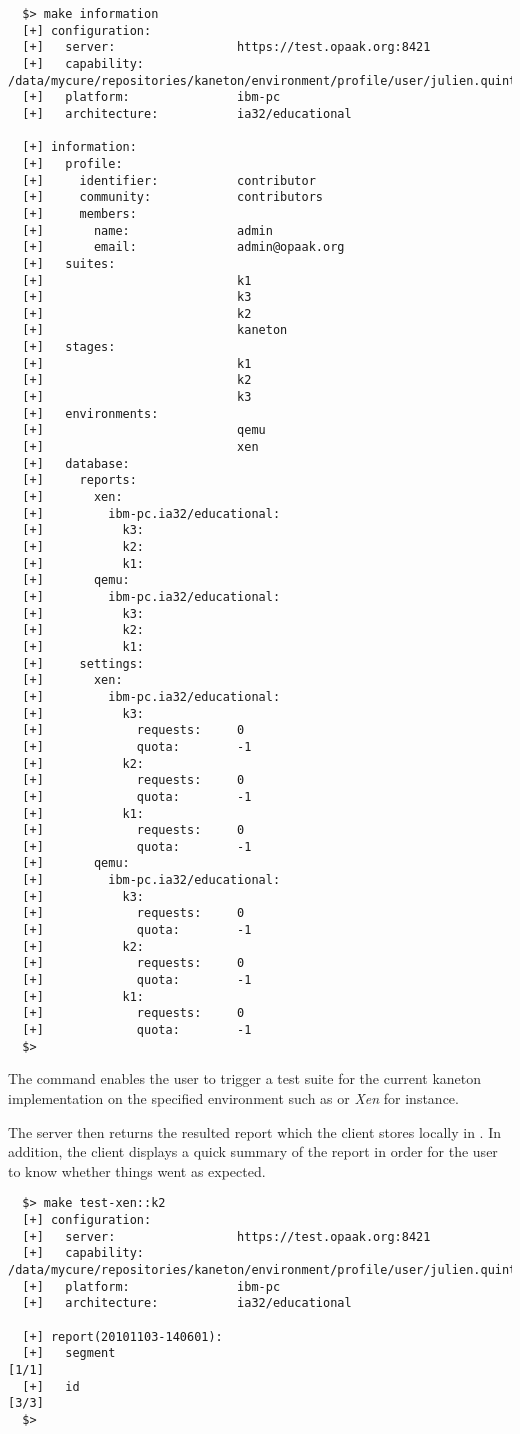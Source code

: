 \begin{verbatim}
  $> make information
  [+] configuration:
  [+]   server:                 https://test.opaak.org:8421
  [+]   capability:             /data/mycure/repositories/kaneton/environment/profile/user/julien.quintard/julien.quintard.cap
  [+]   platform:               ibm-pc
  [+]   architecture:           ia32/educational

  [+] information:
  [+]   profile:
  [+]     identifier:           contributor
  [+]     community:            contributors
  [+]     members:
  [+]       name:               admin
  [+]       email:              admin@opaak.org
  [+]   suites:
  [+]                           k1
  [+]                           k3
  [+]                           k2
  [+]                           kaneton
  [+]   stages:
  [+]                           k1
  [+]                           k2
  [+]                           k3
  [+]   environments:
  [+]                           qemu
  [+]                           xen
  [+]   database:
  [+]     reports:
  [+]       xen:
  [+]         ibm-pc.ia32/educational:
  [+]           k3:
  [+]           k2:
  [+]           k1:
  [+]       qemu:
  [+]         ibm-pc.ia32/educational:
  [+]           k3:
  [+]           k2:
  [+]           k1:
  [+]     settings:
  [+]       xen:
  [+]         ibm-pc.ia32/educational:
  [+]           k3:
  [+]             requests:     0
  [+]             quota:        -1
  [+]           k2:
  [+]             requests:     0
  [+]             quota:        -1
  [+]           k1:
  [+]             requests:     0
  [+]             quota:        -1
  [+]       qemu:
  [+]         ibm-pc.ia32/educational:
  [+]           k3:
  [+]             requests:     0
  [+]             quota:        -1
  [+]           k2:
  [+]             requests:     0
  [+]             quota:        -1
  [+]           k1:
  [+]             requests:     0
  [+]             quota:        -1
  $> 
\end{verbatim}

The  command enables the user to trigger a test suite for the
current kaneton implementation on the specified environment such as 
or \textit{Xen} for instance.

The server then returns the resulted report which the client stores locally
in . In addition, the client displays a quick
summary of the report in order for the user to know whether things went
as expected.

\begin{verbatim}
  $> make test-xen::k2
  [+] configuration:
  [+]   server:                 https://test.opaak.org:8421
  [+]   capability:             /data/mycure/repositories/kaneton/environment/profile/user/julien.quintard/julien.quintard.cap
  [+]   platform:               ibm-pc
  [+]   architecture:           ia32/educational

  [+] report(20101103-140601):
  [+]   segment                                                           [1/1]
  [+]   id                                                                [3/3]
  $> 
\end{verbatim}


